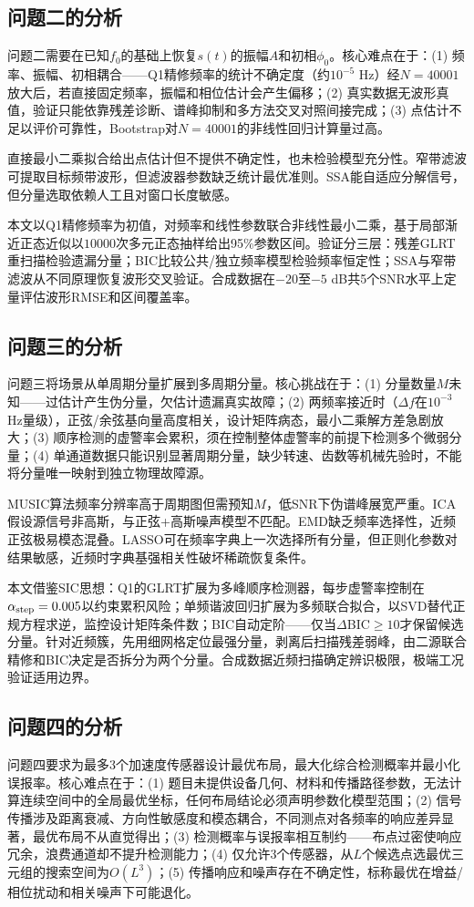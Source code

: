 \documentclass[withoutpreface,bwprint]{cumcmthesis}
\begin{document}
\subsection{问题二的分析}
问题二需要在已知$f_0$的基础上恢复$s(t)$的振幅$A$和初相$\phi_0$。核心难点在于：(1) 频率、振幅、初相耦合——Q1精修频率的统计不确定度（约$10^{-5}$ Hz）经$N=40001$放大后，若直接固定频率，振幅和相位估计会产生偏移；(2) 真实数据无波形真值，验证只能依靠残差诊断、谱峰抑制和多方法交叉对照间接完成；(3) 点估计不足以评价可靠性，Bootstrap对$N=40001$的非线性回归计算量过高。

直接最小二乘拟合给出点估计但不提供不确定性，也未检验模型充分性。窄带滤波可提取目标频带波形，但滤波器参数缺乏统计最优准则。SSA能自适应分解信号，但分量选取依赖人工且对窗口长度敏感。

本文以Q1精修频率为初值，对频率和线性参数联合非线性最小二乘，基于局部渐近正态近似以$10000$次多元正态抽样给出95\%参数区间。验证分三层：残差GLRT重扫描检验遗漏分量；BIC比较公共/独立频率模型检验频率恒定性；SSA与窄带滤波从不同原理恢复波形交叉验证。合成数据在$-20$至$-5$ dB共5个SNR水平上定量评估波形RMSE和区间覆盖率。

\subsection{问题三的分析}
问题三将场景从单周期分量扩展到多周期分量。核心挑战在于：(1) 分量数量$M$未知——过估计产生伪分量，欠估计遗漏真实故障；(2) 两频率接近时（$\Delta f$在$10^{-3}$ Hz量级），正弦/余弦基向量高度相关，设计矩阵病态，最小二乘解方差急剧放大；(3) 顺序检测的虚警率会累积，须在控制整体虚警率的前提下检测多个微弱分量；(4) 单通道数据只能识别显著周期分量，缺少转速、齿数等机械先验时，不能将分量唯一映射到独立物理故障源。

MUSIC算法频率分辨率高于周期图但需预知$M$，低SNR下伪谱峰展宽严重。ICA假设源信号非高斯，与正弦+高斯噪声模型不匹配。EMD缺乏频率选择性，近频正弦极易模态混叠。LASSO可在频率字典上一次选择所有分量，但正则化参数对结果敏感，近频时字典基强相关性破坏稀疏恢复条件。

本文借鉴SIC思想：Q1的GLRT扩展为多峰顺序检测器，每步虚警率控制在$\alpha_{\rm step}=0.005$以约束累积风险；单频谐波回归扩展为多频联合拟合，以SVD替代正规方程求逆，监控设计矩阵条件数；BIC自动定阶——仅当$\Delta$BIC$\ge10$才保留候选分量。针对近频簇，先用细网格定位最强分量，剥离后扫描残差弱峰，由二源联合精修和BIC决定是否拆分为两个分量。合成数据近频扫描确定辨识极限，极端工况验证适用边界。

\subsection{问题四的分析}
问题四要求为最多3个加速度传感器设计最优布局，最大化综合检测概率并最小化误报率。核心难点在于：(1) 题目未提供设备几何、材料和传播路径参数，无法计算连续空间中的全局最优坐标，任何布局结论必须声明参数化模型范围；(2) 信号传播涉及距离衰减、方向性敏感度和模态耦合，不同测点对各频率的响应差异显著，最优布局不从直觉得出；(3) 检测概率与误报率相互制约——布点过密使响应冗余，浪费通道却不提升检测能力；(4) 仅允许3个传感器，从$L$个候选点选最优三元组的搜索空间为$O(L^3)$；(5) 传播响应和噪声存在不确定性，标称最优在增益/相位扰动和相关噪声下可能退化。
\end{document}
